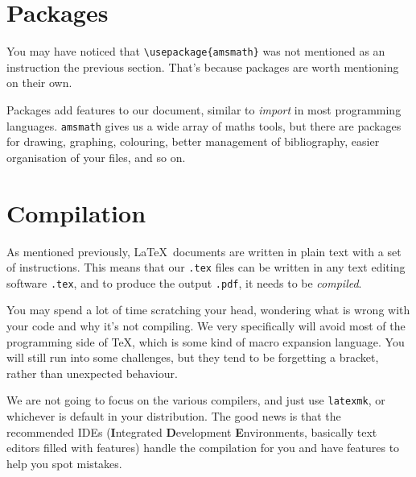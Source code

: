 \section{Packages}
    You may have noticed that \verb|\usepackage{amsmath}| was not mentioned as an instruction the previous section. That's because packages are worth mentioning on their own.

    Packages add features to our document, similar to \emph{import} in most programming languages.
    \verb|amsmath| gives us a wide array of maths tools, but there are packages for drawing, graphing, colouring, better management of bibliography, easier organisation of your files, and so on.
    
\section{Compilation}
    As mentioned previously, \LaTeX\ documents are written in plain text with a set of instructions.
    This means that our \texttt{.tex} files can be written in any text editing software \verb|.tex|, and to produce the output \verb|.pdf|, it needs to be \emph{compiled}.

    You may spend a lot of time scratching your head, wondering what is wrong with your code and why it's not compiling.
    We very specifically will avoid most of the programming side of \TeX, which is some kind of macro expansion language.
    You will still run into some challenges, but they tend to be forgetting a bracket, rather than unexpected behaviour.

    We are not going to focus on the various compilers, and just use \texttt{latexmk}, or whichever is default in your distribution.
    The good news is that the recommended IDEs (\textbf{I}ntegrated \textbf{D}evelopment \textbf{E}nvironments, basically text editors filled with features) handle the compilation for you and have features to help you spot mistakes.